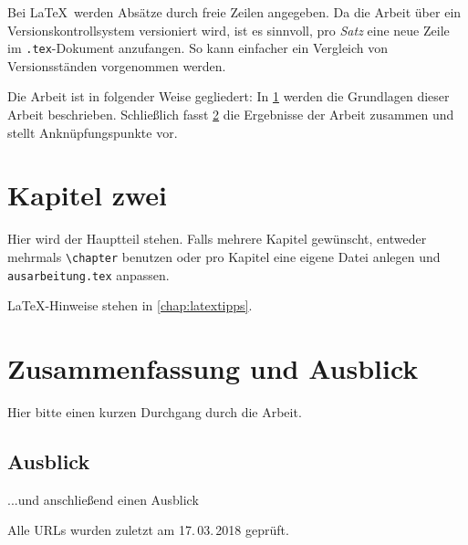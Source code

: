 \documentclass[
  a4paper,  %
  twoside,  %
  bibliography=totoc,
  headsepline,
  cleardoublepage=empty,
  parskip=half,
  draft=false
]{scrbook}
\begin{document}
Bei \LaTeX\ werden Absätze durch freie Zeilen angegeben.
Da die Arbeit über ein Versionskontrollsystem versioniert wird, ist es sinnvoll, pro \emph{Satz} eine neue Zeile im \texttt{.tex}-Dokument anzufangen.
So kann einfacher ein Vergleich von Versionsständen vorgenommen werden.

Die Arbeit ist in folgender Weise gegliedert:
In \cref{chap:k2} werden die Grundlagen dieser Arbeit beschrieben.
Schließlich fasst \cref{chap:zusfas} die Ergebnisse der Arbeit zusammen und stellt Anknüpfungspunkte vor.


\chapter{Kapitel zwei}
\label{chap:k2}

Hier wird der Hauptteil stehen.
Falls mehrere Kapitel gewünscht, entweder mehrmals \texttt{\textbackslash{}chapter} benutzen oder pro Kapitel eine eigene Datei anlegen und \texttt{ausarbeitung.tex} anpassen.

LaTeX-Hinweise stehen in \cref{chap:latextipps}.

\blinddocument


\chapter{Zusammenfassung und Ausblick}\label{chap:zusfas}
Hier bitte einen kurzen Durchgang durch die Arbeit.

\section*{Ausblick}
...und anschließend einen Ausblick



\appendix


\clearpage


\printbibliography

Alle URLs wurden zuletzt am 17.\,03.\,2018 geprüft.

\pagestyle{empty}
\renewcommand*{\chapterpagestyle}{empty}
\Versicherung
\end{document}

